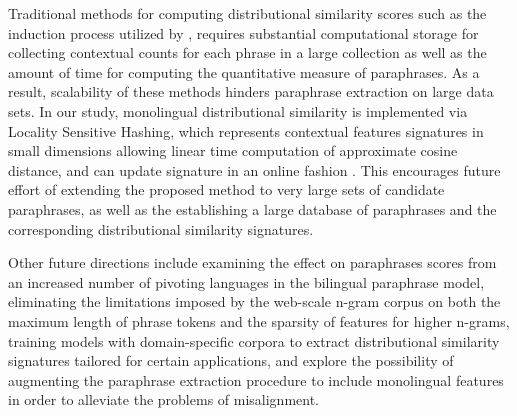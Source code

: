 \documentclass[11pt]{article}
\begin{document}
{{%

Traditional methods for computing distributional similarity scores such as the induction process utilized by , requires substantial computational storage for collecting contextual counts for each phrase in a large collection as well as the amount of time for computing the quantitative measure of paraphrases. As a result, scalability of these methods hinders paraphrase extraction on large data sets. In our study, monolingual distributional similarity is implemented via Locality Sensitive Hashing, which represents contextual features signatures in small dimensions allowing linear time computation of approximate cosine distance, and can update signature in an online fashion \cite{Charikar02,VanDurmeLallACL10}. This encourages future effort of extending the proposed method to very large sets of candidate paraphrases, as well as the establishing a large database of paraphrases and the corresponding distributional similarity signatures.

Other future directions include examining the effect on paraphrases scores from an increased number of pivoting languages in the bilingual paraphrase model, eliminating the limitations imposed by the web-scale n-gram corpus on both the maximum length of phrase tokens and the sparsity of features for higher n-grams, training models with domain-specific corpora to extract distributional similarity signatures tailored for certain applications, and explore the possibility of augmenting the paraphrase extraction procedure to include monolingual features in order to alleviate the problems of misalignment.


}}
\end{document}
